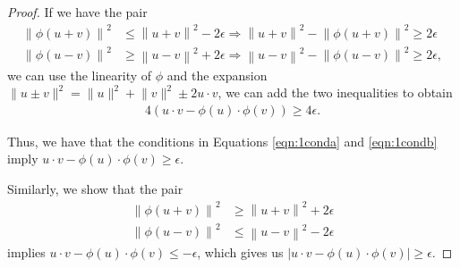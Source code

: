 \begin{proof}
  If we have the pair
  \begin{align}
    \left\lVert \phi(u + v) \right\rVert^2
    &\leq \left\lVert
      u + v
      \right\rVert^2 - 2\epsilon \Rightarrow
      \left\lVert
      u + v
      \right\rVert^2 -
      \left\lVert \phi(u + v) \right\rVert^2
      \geq
      2\epsilon
    \\
    \left\lVert \phi(u - v) \right\rVert^2
    &\geq \left\lVert
      u - v
      \right\rVert^2 + 2\epsilon \Rightarrow
      \left\lVert
      u - v
      \right\rVert^2 -
      \left\lVert \phi(u - v) \right\rVert^2
      \geq
      2\epsilon,
  \end{align}
  we can use the linearity of $\phi$ and the expansion
  $\lVert u \pm v \rVert^2 = \lVert u \rVert^2 + \lVert v \rVert^2 \pm 2u \cdot
  v$, we can add the two inequalities to obtain
  \begin{align}
    4\left(
    u \cdot v
    -
    \phi\left(u\right)\cdot\phi\left(v\right)
    \right)
    \geq 4\epsilon.
    \nonumber
  \end{align}

  Thus, we have that the conditions in Equations \ref{eqn:1conda} and
  \ref{eqn:1condb} imply
  $u \cdot v - \phi\left(u\right)\cdot\phi\left(v\right) \geq \epsilon$.

  Similarly, we show that the pair
  \begin{align}
    \left\lVert \phi(u + v) \right\rVert^2
    &\geq \left\lVert
      u + v
      \right\rVert^2 + 2\epsilon 
    \\
    \left\lVert \phi(u - v) \right\rVert^2
    &\leq \left\lVert
      u - v
      \right\rVert^2 - 2\epsilon
  \end{align}
  implies
  $u \cdot v - \phi\left(u\right)\cdot\phi\left(v\right) \leq -\epsilon$, which
  gives us
  $\left\lvert u \cdot v - \phi\left(u\right)\cdot\phi\left(v\right)
  \right\rvert \geq \epsilon.$
\end{proof}
